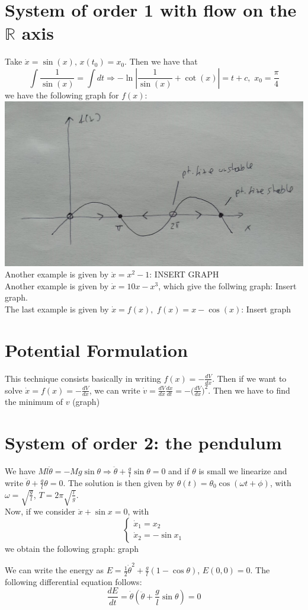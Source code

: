 \documentclass[10pt,a4paper]{book}
\begin{document}
\section{System of order 1 with flow on the $\mathbb{R}$ axis}
Take $\dot{x}=\sin(x),\, x(t_0)=x_0$. Then we have that 
$$\int \frac{1}{\sin(x)}=\int dt\Rightarrow -\ln|\frac{1}{\sin(x)}+\cot(x)|=t+c,\,\,x_0=\frac{\pi}{4}$$
we have the following graph for $f(x)$:\\
\includegraphics[scale=0.3]{fig2}\\
Another example is given by $\dot{x}=x^2-1$: 
INSERT GRAPH\\
Another example is given by $\dot{x}=10x-x^3$, which give the follwing graph:
Insert graph.\\
The last example is given by $\dot{x}=f(x),\,\, f(x)=x-\cos(x)$:
Insert graph\\


\section{Potential Formulation}
This technique consists basically in writing $f(x)=-\frac{dV}{dx}$. Then if we want to solve $\dot{x}=f(x)=-\frac{dV}{dx}$, we can write $\dot{v}=\frac{dV}{dx}\frac{dx}{dt}=-\big(\frac{dV}{dx}\big)^2$. Then we have to find the minimum of $v$ (graph)

\section{System of order 2: the pendulum}
We have $Ml\ddot{\theta}=-Mg\sin\theta\Rightarrow\ddot{\theta}+\frac{g}{l}\sin\theta=0$ and if $\theta$ is small we linearize and write $\ddot{\theta}+\frac{g}{l}\theta=0$. The solution is then given   by $\theta(t)=\theta_0\cos(\omega t+\phi)$, with $\omega=\sqrt{\frac{g}{l}}$, $T=2\pi\sqrt{\frac{l}{g}}$. \\
Now, if we consider $\ddot{x}+\sin x=0$, with 
$$\begin{cases}
\dot{x}_1=x_2\\
\dot{x}_2=-\sin x_1
\end{cases}
$$ we obtain the following graph:
graph


We can write the energy as $E=\frac{1}{2}\dot{\theta}^2+\frac{g}{l}(1-\cos\theta)$, $E(0,0)=0$. The following differential equation follows:
$$\frac{dE}{dt}=\dot{\theta}(\ddot{\theta}+\frac{g}{l}\sin\theta)=0$$
\end{document}
